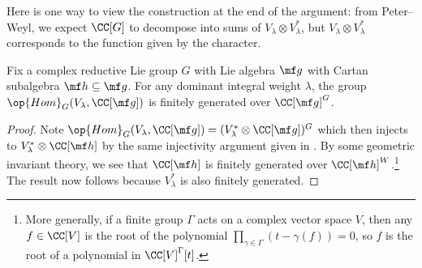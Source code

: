 \documentclass[../notes.tex]{subfiles}
\begin{document}
\begin{remark}
	Here is one way to view the construction at the end of the argument: from Peter--Weyl, we expect $\CC[G]$ to decompose into sums of $V_\lambda\otimes V_\lambda^*$, but $V_\lambda\otimes V_\lambda^*$ corresponds to the function given by the character.
\end{remark}
\begin{corollary} \label{cor:apply-chev-res}
	Fix a complex reductive Lie group $G$ with Lie algebra $\mf g$ with Cartan subalgebra $\mf h\subseteq\mf g$. For any dominant integral weight $\lambda$, the group $\op{Hom}_G(V_\lambda,\CC[\mf g])$ is finitely generated over $\CC[\mf g]^G$.
\end{corollary}
\begin{proof}
	Note $\op{Hom}_G(V_\lambda,\CC[\mf g])=(V_\lambda^*\otimes\CC[\mf g])^G$ which then injects to $V_\lambda^*\otimes\CC[\mf h]$ by the same injectivity argument given in . By some geometric invariant theory, we see that $\CC[\mf h]$ is finitely generated over $\CC[\mf h]^W$.\footnote{More generally, if a finite group $\Gamma$ acts on a complex vector space $V$, then any $f\in\CC[V]$ is the root of the polynomial $\prod_{\gamma\in\Gamma}(t-\gamma(f))=0$, so $f$ is the root of a polynomial in $\CC[V]^\Gamma[t]$.} The result now follows because $V_\lambda^*$ is also finitely generated.
\end{proof}
\end{document}
